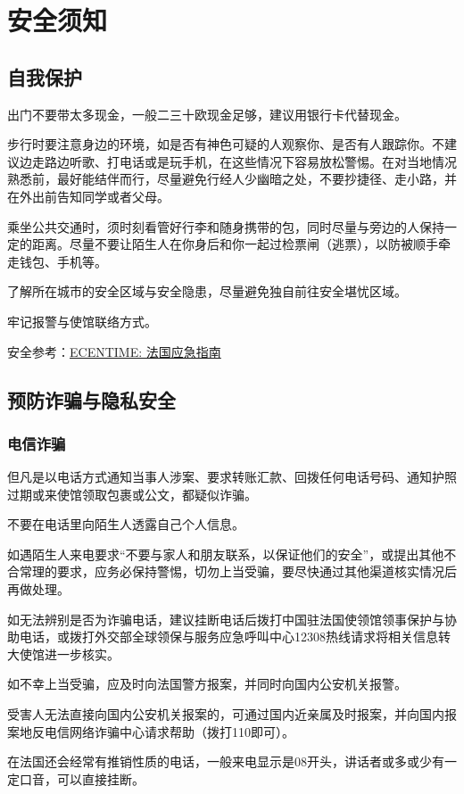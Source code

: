 \section{安全须知}
\subsection{自我保护}
出门不要带太多现金，一般二三十欧现金足够，建议用银行卡代替现金。

步行时要注意身边的环境，如是否有神色可疑的人观察你、是否有人跟踪你。不建议边走路边听歌、打电话或是玩手机，在这些情况下容易放松警惕。在对当地情况熟悉前，最好能结伴而行，尽量避免行经人少幽暗之处，不要抄捷径、走小路，并在外出前告知同学或者父母。

乘坐公共交通时，须时刻看管好行李和随身携带的包，同时尽量与旁边的人保持一定的距离。尽量不要让陌生人在你身后和你一起过检票闸（逃票），以防被顺手牵走钱包、手机等。

了解所在城市的安全区域与安全隐患，尽量避免独自前往安全堪忧区域。

牢记报警与使馆联络方式。

安全参考：\href{https://www.ecentime.com/article/GuideUrgenceFrance}{ECENTIME: 法国应急指南}
 

\subsection{预防诈骗与隐私安全}
\subsubsection{电信诈骗}
但凡是以电话方式通知当事人涉案、要求转账汇款、回拨任何电话号码、通知护照过期或来使馆领取包裹或公文，都疑似诈骗。

不要在电话里向陌生人透露自己个人信息。

如遇陌生人来电要求“不要与家人和朋友联系，以保证他们的安全”，或提出其他不合常理的要求，应务必保持警惕，切勿上当受骗，要尽快通过其他渠道核实情况后再做处理。

如无法辨别是否为诈骗电话，建议挂断电话后拨打中国驻法国使领馆领事保护与协助电话，或拨打外交部全球领保与服务应急呼叫中心12308热线请求将相关信息转大使馆进一步核实。

如不幸上当受骗，应及时向法国警方报案，并同时向国内公安机关报警。

受害人无法直接向国内公安机关报案的，可通过国内近亲属及时报案，并向国内报案地反电信网络诈骗中心请求帮助（拨打110即可）。

在法国还会经常有推销性质的电话，一般来电显示是08开头，讲话者或多或少有一定口音，可以直接挂断。

